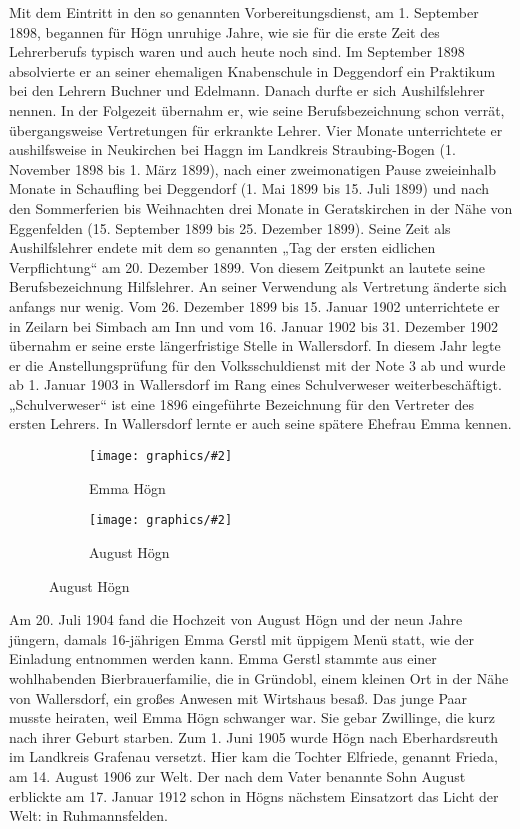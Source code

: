 \documentclass{book}
\newcommand{\img}[2][width=\linewidth]{\noindent\texttt{[image: graphics/\#2]}}
\begin{document}
Mit dem Eintritt in den so genannten Vorbereitungsdienst, am 1.
September 1898, begannen für Högn unruhige Jahre, wie sie für die erste
Zeit des Lehrerberufs typisch waren und auch heute noch sind. Im
September 1898 absolvierte er an seiner ehemaligen Knabenschule in
Deggendorf ein Praktikum bei den Lehrern Buchner und Edelmann. Danach
durfte er sich Aushilfslehrer nennen. In der Folgezeit übernahm er, wie
seine Berufsbezeichnung schon verrät, übergangsweise Vertretungen für
erkrankte Lehrer. Vier Monate unterrichtete er aushilfsweise in
Neukirchen bei Haggn im Landkreis Straubing-Bogen (1. November 1898 bis
1. März 1899), nach einer zweimonatigen Pause zweieinhalb Monate in
Schaufling bei Deggendorf (1. Mai 1899 bis 15. Juli 1899) und nach den
Sommerferien bis Weihnachten drei Monate in Geratskirchen in der Nähe
von Eggenfelden (15. September 1899 bis 25. Dezember 1899). Seine Zeit
als Aushilfslehrer endete mit dem so genannten „Tag der ersten
eidlichen Verpflichtung“ am 20. Dezember 1899. Von diesem Zeitpunkt
an lautete seine Berufsbezeichnung Hilfslehrer. An seiner Verwendung
als Vertretung änderte sich anfangs nur wenig. Vom 26. Dezember 1899
bis 15. Januar 1902 unterrichtete er in Zeilarn bei Simbach am Inn und
vom 16. Januar 1902 bis 31. Dezember 1902 übernahm er seine erste
längerfristige Stelle in Wallersdorf. In diesem Jahr legte er die
Anstellungsprüfung für den Volksschuldienst mit der Note 3 ab und wurde
ab 1. Januar 1903 in Wallersdorf im Rang eines Schulverweser
weiterbeschäftigt. „Schulverweser“ ist eine 1896 eingeführte
Bezeichnung für den Vertreter des ersten Lehrers. In Wallersdorf
lernte er auch seine spätere Ehefrau Emma kennen.

\begin{figure}

\begin{subfigure}[b]{0.5\linewidth}
\img{Emma-Hoegn}
\caption{Emma Högn}
\end{subfigure}%
%
\begin{subfigure}[b]{0.5\linewidth}
\img{August-Hoegn}
\caption{August Högn}
\end{subfigure}

\end{figure}

Am 20. Juli 1904 fand die Hochzeit von August Högn und der neun Jahre
jüngern, damals 16-jährigen Emma Gerstl mit üppigem Menü statt, wie der
Einladung entnommen werden kann. Emma Gerstl stammte aus einer
wohlhabenden Bierbrauerfamilie, die in Gründobl, einem kleinen Ort in
der Nähe von Wallersdorf, ein großes Anwesen mit Wirtshaus besaß. Das
junge Paar musste heiraten, weil Emma Högn schwanger war. Sie gebar
Zwillinge, die kurz nach ihrer Geburt starben. Zum 1. Juni 1905 wurde
Högn nach Eberhardsreuth im Landkreis Grafenau versetzt. Hier kam die
Tochter Elfriede, genannt Frieda, am 14. August 1906 zur Welt. Der nach
dem Vater benannte Sohn August erblickte am 17. Januar 1912 schon in
Högns nächstem Einsatzort das Licht der Welt: in Ruhmannsfelden.
\end{document}
